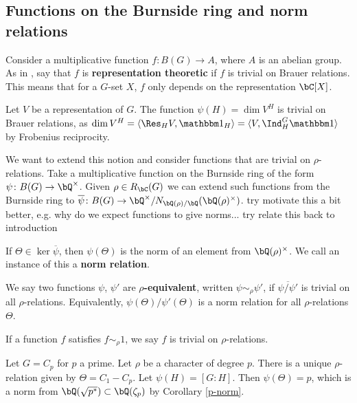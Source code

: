 \subsection{Functions on the Burnside ring and norm relations}

Consider a multiplicative function $f \colon B(G) \to A$, where $A$ is an abelian group. As in \cite{reg-const}, say that $f$ is \textbf{representation theoretic} if $f$ is trivial on Brauer relations. This means that for a $G$-set $X$, $f$ only depends on the representation $\bC[X]$. 

\begin{example}
  Let $V$ be a representation of $G$. The function $\psi(H) = \dim V^H$ is trivial on Brauer relations, as $\dim V^H = \langle \Res_{H} V , \trivial_H \rangle = \langle V, \Ind_{H}^G \trivial \rangle$ by Frobenius reciprocity.
\end{example}

We want to extend this notion and consider functions that are trivial on $\rho$-relations.
Take a multiplicative function on the Burnside ring of the form $\psi \colon B(G) \to \bQ^{\times}$. Given $\rho \in R_{\bC}(G)$ we can extend such functions from the Burnside ring to $\overline{\psi} \colon B(G) \to \bQ^{\times} / N_{\bQ(\rho) / \bQ}(\bQ(\rho)^\times)$. {\color{red} try motivate this a bit better, e.g. why do we expect functions to give norms... try relate this back to introduction}

\begin{defn}
If $\Theta \in \ker \overline{\psi}$, then $\psi(\Theta)$ is the norm of an element from $\bQ(\rho)^{\times}$. We call an instance of this a \textbf{norm relation}.
\end{defn}

\begin{defn}
 We say two functions $\psi$, $\psi'$ are \textbf{$\rho$-equivalent}, written $\psi \sim_{\rho} \psi'$, if $\overline{\psi /\psi'}$ is trivial on all $\rho$-relations. Equivalently, $\psi(\Theta) / \psi'(\Theta)$ is a norm relation for all $\rho$-relations $\Theta$. 
\end{defn}

If a function $f$ satisfies $f \sim_{\rho} 1$, we say $f$ is trivial on $\rho$-relations. 

\begin{example}
    Let $G = C_p$ for $p$ a prime. Let $\rho$ be a character of degree $p$. There is a unique $\rho$-relation given by $\Theta = C_1 - C_p$. Let $\psi(H) = [G \colon H]$. Then $\psi(\Theta) = p$, which is a norm from $\bQ(\sqrt{p^*}) \subset \bQ(\zeta_p)$ by Corollary \ref{p-norm}. 
\end{example}

